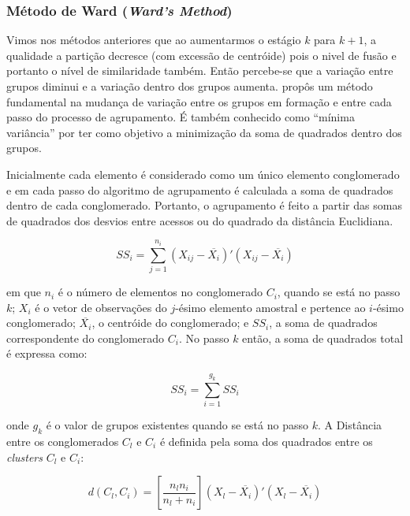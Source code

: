 \documentclass[
]{book}
\begin{document}
\hypertarget{muxe9todo-de-ward-wards-method}{%
\subsubsection{\texorpdfstring{Método de Ward (\emph{Ward's Method})}{Método de Ward (Ward's Method)}}\label{muxe9todo-de-ward-wards-method}}

Vimos nos métodos anteriores que ao aumentarmos o estágio \(k\) para \(k+1\), a qualidade a partição decresce (com excessão de centróide) pois o nivel de fusão e portanto o nível de similaridade também. Então percebe-se que a variação entre grupos diminui e a variação dentro dos grupos aumenta. \citet{ward1963hierarchical} propôs um método fundamental na mudança de variação entre os grupos em formação e entre cada passo do processo de agrupamento. É também conhecido como ``mínima variância'' por ter como objetivo a minimização da soma de quadrados dentro dos grupos.

Inicialmente cada elemento é considerado como um único elemento conglomerado e em cada passo do algoritmo de agrupamento é calculada a soma de quadrados dentro de cada conglomerado. Portanto, o agrupamento é feito a partir das somas de quadrados dos desvios entre acessos ou do quadrado da distância Euclidiana.

\begin{equation}
 SS_i=\displaystyle \sum^{n_i}_{j=1} (X_{ij}-\overline{X_i})'(X_{ij}-\overline{X_i})
 \label{eq:sumquadraeuclid}
\end{equation}

em que \(n_i\) é o número de elementos no conglomerado \(C_i\), quando se está no passo \(k\); \(X_i\) é o vetor de observações do \(j\)-ésimo elemento amostral e pertence ao \(i\)-ésimo conglomerado; \(\overline{X_i}\), o centróide do conglomerado; e \(SS_i\), a soma de quadrados correspondente do conglomerado \(C_i\). No passo \(k\) então, a soma de quadrados total é expressa como:

\begin{equation}
 SS_i=\displaystyle \sum^{g_k}_{i=1}SS_i
 \label{eq:sumquadrak}
\end{equation}

onde \(g_k\) é o valor de grupos existentes quando se está no passo \(k\).
A Distância entre os conglomerados \(C_l\) e \(C_i\) é definida pela soma dos quadrados entre os \emph{clusters} \(C_l\) e \(C_i\):

\begin{equation}
 d(C_l,C_i)=[\frac{n_l n_i}{n_l+n_i}] (X_{l}-\overline{X_i})'(X_{l}-\overline{X_i})
 \label{eq:distward}
\end{equation}
\end{document}
